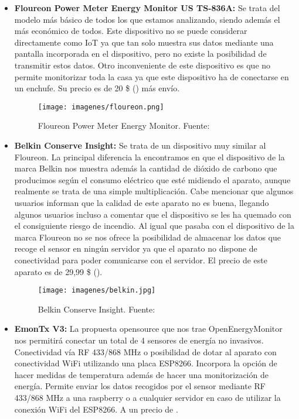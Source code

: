 \begin{itemize}
\item\textbf{Floureon Power Meter Energy Monitor US TS-836A: } Se trata del modelo más básico de todos los que estamos analizando, siendo además el más económico de todos. Este dispositivo no se puede considerar directamente como IoT ya que tan solo muestra sus datos mediante una pantalla incorporada en el dispositivo, pero no existe la posibilidad de transmitir estos datos. Otro inconveniente de este dispositivo es que no permite monitorizar toda la casa ya que este dispositivo ha de conectarse en un enchufe. Su precio es de 20 \$ () más envío.\cite{floureon}

\begin{figure}[H]
	\centering
	\texttt{[image: imagenes/floureon.png]}
	\caption[Floureon Power Meter Energy Monitor.]{Floureon Power Meter Energy Monitor. Fuente: \cite{floureon}}
	\label{fig:floureon}
\end{figure}

\item\textbf{Belkin Conserve Insight: } Se trata de un dispositivo muy similar al Floureon. La principal diferencia la encontramos en que el dispositivo de la marca Belkin nos muestra además la cantidad de dióxido de carbono que producimos según el consumo eléctrico que esté midiendo el aparato, aunque realmente se trata de una simple multiplicación. Cabe mencionar que algunos usuarios informan que la calidad de este aparato no es buena, llegando algunos usuarios incluso a comentar que el dispositivo se les ha quemado con el consiguiente riesgo de incendio. Al igual que pasaba con el dispositivo de la marca Floureon no se nos ofrece la posibilidad de almacenar los datos que recoge el sensor en ningún servidor ya que el aparato no dispone de conectividad para poder comunicarse con el servidor. El precio de este aparato es de 29,99 \$ (). \cite{Belkin}

\begin{figure}[H]
	\centering
	\texttt{[image: imagenes/belkin.jpg]}
	\caption[Belkin Conserve Insight.]{Belkin Conserve Insight. Fuente: \cite{Belkin}}
	\label{fig:Belkin}
\end{figure}

\item\textbf{EmonTx V3: } La propuesta opensource que nos trae OpenEnergyMonitor nos permitirá conectar un total de 4 sensores de energía no invasivos. Conectividad vía RF 433/868 MHz o posibilidad de dotar al aparato con conectividad WiFi utilizando una placa ESP8266. Incorpora la opción de hacer medidas de temperatura además de hacer una monitorización de energía. Permite enviar los datos recogidos por el sensor mediante RF 433/868 MHz a una raspberry o a cualquier servidor en caso de utilizar la conexión WiFi del ESP8266. A un precio de .\cite{emonTx}


\end{itemize}
